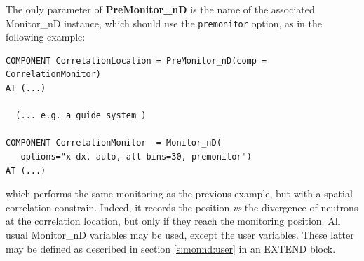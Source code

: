 The only parameter of \textbf{PreMonitor\_nD} is the name of the associated Monitor\_nD instance, which should use the \verb+premonitor+ option, as in the following example:
\begin{lstlisting}
COMPONENT CorrelationLocation = PreMonitor_nD(comp = CorrelationMonitor)
AT (...)

  (... e.g. a guide system )

COMPONENT CorrelationMonitor  = Monitor_nD(
   options="x dx, auto, all bins=30, premonitor")
AT (...)
\end{lstlisting}
which performs the same monitoring as the previous example, but with a spatial correlation constrain. Indeed, it records the position \textit{vs} the divergence of neutrons at the correlation location, but only if they reach the monitoring position. All usual Monitor\_nD variables may be used, except the user variables. These latter may be defined as described in section \ref{s:monnd:user} in an EXTEND block.

